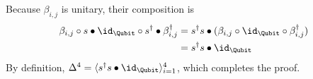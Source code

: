 Because $\beta_{i,j}$ is unitary, their composition is
\begin{align*}
    \beta_{i,j} \circ s \bullet \id_\Qubit \circ s^\dagger \bullet \beta_{i,j}^\dagger 
    &= s^\dagger s \bullet(\beta_{i,j} \circ \id_\Qubit \circ \beta_{i,j}^\dagger) \\
    &= s^\dagger s \bullet \id_\Qubit
\end{align*}
By definition,
$\Delta^4 = \langle s^\dagger s \bullet \id_\Qubit \rangle_{i=1}^4$, which completes the proof.

